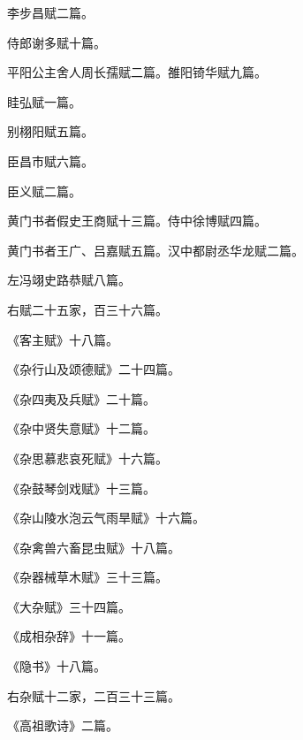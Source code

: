 \documentclass[12pt,UTF8]{ctexbook}
\begin{document}
李步昌赋二篇。



侍郎谢多赋十篇。



平阳公主舍人周长孺赋二篇。雒阳锜华赋九篇。



眭弘赋一篇。



别栩阳赋五篇。



臣昌市赋六篇。



臣义赋二篇。



黄门书者假史王商赋十三篇。侍中徐博赋四篇。



黄门书者王广、吕嘉赋五篇。汉中都尉丞华龙赋二篇。



左冯翊史路恭赋八篇。



右赋二十五家，百三十六篇。



《客主赋》十八篇。



《杂行山及颂德赋》二十四篇。



《杂四夷及兵赋》二十篇。



《杂中贤失意赋》十二篇。



《杂思慕悲哀死赋》十六篇。



《杂鼓琴剑戏赋》十三篇。



《杂山陵水泡云气雨旱赋》十六篇。



《杂禽兽六畜昆虫赋》十八篇。



《杂器械草木赋》三十三篇。



《大杂赋》三十四篇。



《成相杂辞》十一篇。



《隐书》十八篇。



右杂赋十二家，二百三十三篇。



《高祖歌诗》二篇。
\end{document}
